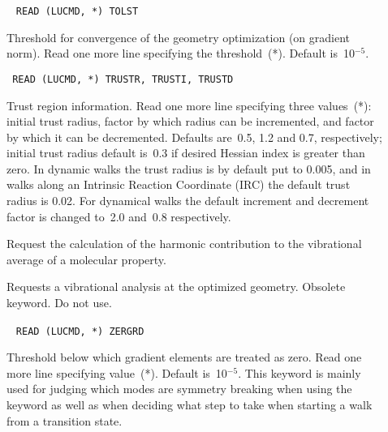 \begin{description}
\item[]\verb| |\newline
\verb|READ (LUCMD, *) TOLST|

Threshold for convergence of the geometry optimization (on gradient
norm).  Read one more line specifying the threshold~(*).  Default
is~10$^{-5}$.

\item[]\verb| |\newline
\verb|READ (LUCMD, *) TRUSTR, TRUSTI, TRUSTD|

Trust region information.  Read one more
line specifying three values~(*): initial trust radius, factor by
which radius can be incremented, and factor by which it can be
decremented.  Defaults are~0.5, 1.2 and 0.7, respectively; initial
trust radius default is~0.3 if desired Hessian index is
greater than zero. In dynamic walks the trust radius
is by default put
to 0.005, and in walks along an Intrinsic Reaction Coordinate
(IRC) the
default trust radius is 0.02. For dynamical walks the default
increment and decrement factor is changed to~2.0 and~0.8
respectively.

\item[]
Request the calculation of the harmonic contribution to the
vibrational average of a molecular property.

\item[] Requests a vibrational analysis at the optimized
geometry. Obsolete keyword. Do not use.

\item[]\verb| |\newline
\verb|READ (LUCMD, *) ZERGRD|

Threshold below which gradient elements are
treated as zero.  Read one more line specifying value~(*). Default
is~10$^{-5}$. This keyword is mainly used for judging which modes are
symmetry breaking when using the keyword  as well as
when deciding what step to take when starting a walk from a transition
state.
\end{description}
